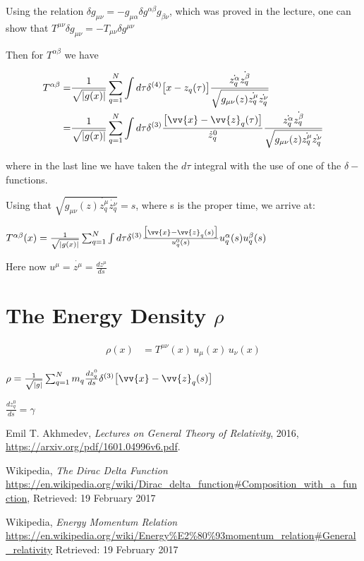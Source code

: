 \documentclass[]{article}
\begin{document}
Using the relation $\delta g_{\mu\nu} = − g_{\mu\alpha} \delta g ^{\alpha\beta} g_{\beta\nu}$, which was proved in the lecture, one can show that $T^{\mu\nu} \delta g_{\mu\nu} = - T_{\mu\nu} \delta g^{\mu\nu}$

Then for $T^{\alpha\beta}$ we have

\begin{align*}
T^{\alpha\beta} =& \frac{1}{\sqrt{|g(x)|}} \sum_{q=1}^{N} \int d\tau \delta^{(4)} \big[x-z_q(\tau)\big]\frac{\dot{z_q^\alpha} \dot{z_q^\beta}}{\sqrt{g_{\mu\nu}(z)\dot{z_q^\mu}\dot{z_q^\nu}}} \\
=& \frac{1}{\sqrt{|g(x)|}} \sum_{q=1}^{N} \int d\tau \delta^{(3)} \frac{\big[\vv{x}-\vv{z}_q(\tau)\big]}{\dot{z}_q^0}\frac{\dot{z_q^\alpha}  \dot{z_q^\beta}}{\sqrt{g_{\mu\nu}(z)\dot{z_q^\mu}\dot{z_q^\nu}}}
\end{align*}


where in the last line we have taken the $d\tau$ integral with the use of one of the $\delta-$ functions.

Using that $\sqrt{g_{\mu\nu}(z)\dot{z_q^\mu}\dot{z_q^\nu}}=s$, where s is the proper time, we arrive at:

$T^{\alpha\beta}(x) = \frac{1}{\sqrt{|g(x)|}} \sum_{q=1}^{N} \int d\tau \delta^{(3)} \frac{\big[\vv{x}-\vv{z}_q(s)\big]}{u_q^0 (s)} u_q^\alpha (s) u_q^\beta (s)$

Here now $u^{\mu} = \dot{z^\mu} = \frac{d z^\mu}{d s}$


\section{The Energy Density $\rho$}

\begin{align}
\rho(x) &= T^{\mu\nu}(x) \, u_\mu(x) \, u_\nu(x)
\end{align}


$\rho = \frac{1}{\sqrt{|g|}} \sum_{q=1}^{N} m_q \frac{d z^0_q}{d s} \delta^{(3)} \big[\vv{x}-\vv{z}_q(s)\big]$ 

$\frac{d z^0_q}{d s}=\gamma$

\begin{thebibliography}{9}
	
	Emil T. Akhmedev,
	\emph{Lectures on General Theory of Relativity},
	2016,
	\url{https://arxiv.org/pdf/1601.04996v6.pdf}.
	
	Wikipedia,
	\emph{The Dirac Delta Function}
	\url{https://en.wikipedia.org/wiki/Dirac_delta_function#Composition_with_a_function},
	Retrieved: 19 February 2017
	
	Wikipedia,
	\emph{Energy Momentum Relation}
	\url{https://en.wikipedia.org/wiki/Energy%E2%80%93momentum_relation#General_relativity}
		Retrieved: 19 February 2017
\end{thebibliography}
\end{document}
